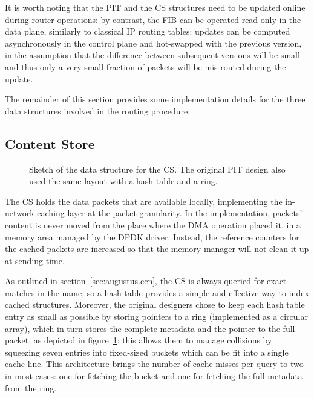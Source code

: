 \documentclass[11pt,a4paper,twoside,titlepage,openany]{book}
\begin{document}
It is worth noting that the \gls{PIT} and the \gls{CS} structures need to be updated online during router operations: by contrast, the \gls{FIB} can be operated read-only in the data plane, similarly to classical IP routing tables: updates can be computed asynchronously in the control plane and hot-swapped with the previous version, in the assumption that the difference between subsequent versions will be small and thus only a very small fraction of packets will be mis-routed during the update.

The remainder of this section provides some implementation details for the three data structures involved in the routing procedure.

\subsection{Content Store}\label{sec:augustus.cs}
\begin{figure}[htb]
  \begin{center}
    \caption[Sketch for the data structure for the CS and orignal PIT.]{Sketch of the data structure for the CS. The original PIT design also used the same layout with a hash table and a ring.}
    \label{fig:augustus.ht_ring}
  \end{center}
\end{figure}

The \gls{CS} holds the data packets that are available locally, implementing the in-network caching layer at the packet granularity. In the implementation, packets' content is never moved from the place where the \gls{DMA} operation placed it, in a memory area managed by the DPDK driver. Instead, the reference counters for the cached packets are increased so that the memory manager will not clean it up at sending time.

As outlined in section~\ref{sec:augustus.ccn}, the CS is always queried for exact matches in the name, so a hash table provides a simple and effective way to index cached structures. Moreover, the original designers chose to keep each hash table entry as small as possible by storing pointers to a ring (implemented as a circular array), which in turn stores the complete metadata and the pointer to the full packet, as depicted in figure~\ref{fig:augustus.ht_ring}: this allows them to manage collisions by squeezing seven entries into fixed-sized buckets which can be fit into a single cache line. This architecture brings the number of cache misses per query to two in most cases: one for fetching the bucket and one for fetching the full metadata from the ring.
\end{document}

